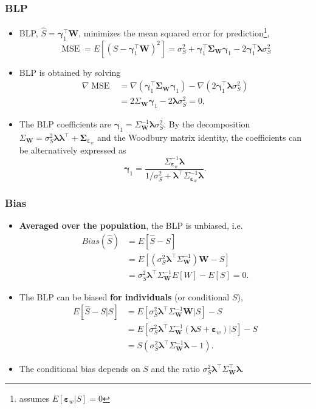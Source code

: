 \documentclass{beamer}
\newcommand{\mbf}[1]{\bm{#1}}
\newcommand{\beps}{\mbf{\varepsilon}}
\newcommand{\bgamma}{\mbf{\gamma}}
\newcommand{\blambda}{\mbf{\lambda}}
\newcommand{\bW}{\mbf{W}}
\newcommand{\bsigma}{\mbf{\Sigma}}
\DeclareMathOperator{\MSE}{MSE}
\begin{document}
	\begin{frame}[t]\frametitle{BLP}
	\begin{itemize}
		\item BLP, $\hat{S} = \bgamma_1^\top \bW$, minimizes the mean squared error
		for prediction\footnote{assumes $E[\beps_w|S] = 0$}, 
		\begin{equation}
			\MSE = E[(S - \bgamma_1^\top \bW)^2] = \sigma_S^2 + \bgamma_1^\top
			\bsigma_{\bW} \bgamma_1 - 2\bgamma_1^\top \blambda \sigma_S^2 
    \end{equation}
    \item BLP is obtained by solving
    \begin{align}
	    \nabla \MSE &= \nabla(\bgamma_1^\top \bsigma_{\bW} \bgamma_1)  - \nabla
	    (2\bgamma_1^\top \blambda \sigma_S^2) \\
	    &= 2\Sigma_{\bW} \bgamma_1 - 2 \blambda \sigma_S^2 = 0,
	  \end{align}
	 	\item The BLP coefficients are $\bgamma_1 = \Sigma_{\bW}^{-1} \blambda
	 	\sigma_S^2$. By the decomposition $\Sigma_{\bW} =
	 	\sigma_S^2\blambda\blambda^\top + \bsigma_{\mbf{\varepsilon}_w}$ and the
	 	Woodbury matrix identity, the coefficients can be alternatively expressed
	 	as 
	 	\begin{equation}
	    \bgamma_1 = \frac{\Sigma_{\mbf{\varepsilon}_w}^{-1}\blambda}{1/\sigma_S^2 +
	    \blambda^\top\Sigma_{\mbf{\varepsilon}_w}^{-1}\blambda}.
	  \end{equation}
	\end{itemize}
	\end{frame}

	\begin{frame}[t]\frametitle{Bias}
		\begin{itemize}
			\item \textbf{Averaged over the population}, the BLP is unbiased, i.e.
			  \begin{align}
			    Bias(\hat{S}) &= E[\hat{S} - S] \nonumber\\
			    &= E[(\sigma_S^2\blambda^\top \Sigma_{\bW}^{-1})\bW - S]\\
			    &= \sigma_S^2\blambda^\top \Sigma_{\bW}^{-1} E[W] - E[S] = 0.
			  \end{align}
			\item The BLP can be biased \textbf{for individuals} (or conditional $S$),
			\begin{align}
		    E[\hat{S} - S|S] &= E[\sigma_S^2\blambda^\top\Sigma_{\bW}^{-1}\bW|S] - S
		    \nonumber\\
		    &= E[\sigma_S^2\blambda^\top\Sigma_{\bW}^{-1}(\blambda S + 
		    \mbf{\varepsilon}_w)|S] - S \nonumber\\
		    &= S(\sigma_S^2\blambda^\top\Sigma_{\bW}^{-1}\blambda - 1). 
		    \label{eq:conditional_bias}
		  \end{align}
		  \item The conditional bias depends on $S$ and the ratio
		  $\sigma_S^2\blambda^\top\Sigma_{\bW}^\top\blambda$. 
		\end{itemize}
	\end{frame}
\end{document}
